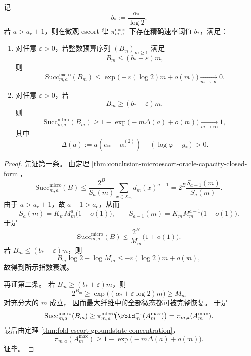 \begin{theorem}[深冻结区的微观预言机相变阈值]\label{thm:conclusion-deepfrozen-microescort-oracle-threshold}
记
\[
b_\ast:=\frac{\alpha_\ast}{\log 2}.
\]
若 \(a>a_{\mathrm c}+1\)，则在微观 escort 律 \(\pi_{m,a}^{\mathrm{micro}}\) 下存在精确速率阈值 \(b_\ast\)，满足：
\begin{enumerate}
  \item 对任意 \(\varepsilon>0\)，若整数预算序列 \((B_m)_{m\ge 1}\) 满足
  \[
  B_m\le (b_\ast-\varepsilon)m,
  \]
  则
  \[
  \mathrm{Succ}^{\mathrm{micro}}_{m,a}(B_m)
  \le
  \exp\!\bigl(-\varepsilon(\log 2)m+o(m)\bigr)
  \xrightarrow[m\to\infty]{}0.
  \]
  \item 对任意 \(\varepsilon>0\)，若
  \[
  B_m\ge (b_\ast+\varepsilon)m,
  \]
  则
  \[
  \mathrm{Succ}^{\mathrm{micro}}_{m,a}(B_m)
  \ge
  1-\exp\!\bigl(-m\Delta(a)+o(m)\bigr)
  \xrightarrow[m\to\infty]{}1,
  \]
  其中
  \[
  \Delta(a):=a(\alpha_\ast-\alpha_\ast^{(2)})-(\log\varphi-g_\ast)>0.
  \]
\end{enumerate}
\end{theorem}
\begin{proof}
先证第一条。
由定理 \ref{thm:conclusion-microescort-oracle-capacity-closed-form}，
\[
\mathrm{Succ}^{\mathrm{micro}}_{m,a}(B)
\le
\frac{2^B}{S_a(m)}
\sum_{x\in X_m}d_m(x)^{a-1}
=
2^B\frac{S_{a-1}(m)}{S_a(m)}.
\]
由于 \(a>a_{\mathrm c}+1\)，故 \(a-1>a_{\mathrm c}\)，从而
\[
S_a(m)=K_mM_m^a\bigl(1+o(1)\bigr),
\qquad
S_{a-1}(m)=K_mM_m^{a-1}\bigl(1+o(1)\bigr).
\]
于是
\[
\mathrm{Succ}^{\mathrm{micro}}_{m,a}(B)
\le
\frac{2^B}{M_m}\bigl(1+o(1)\bigr).
\]
若 \(B_m\le (b_\ast-\varepsilon)m\)，则
\[
B_m\log 2-\log M_m
\le
-\varepsilon(\log 2)m+o(m),
\]
故得到所示指数衰减。

再证第二条。
若 \(B_m\ge (b_\ast+\varepsilon)m\)，则
\[
2^{B_m}\ge \exp\!\bigl((\alpha_\ast+\varepsilon\log 2)m\bigr)\ge M_m
\]
对充分大的 \(m\) 成立，
因而最大纤维中的全部微态都可被完整恢复。
于是
\[
\mathrm{Succ}^{\mathrm{micro}}_{m,a}(B_m)
\ge
\pi_{m,a}^{\mathrm{micro}}\!\bigl(\Fold_m^{-1}(A_m^{\max})\bigr)
=
\pi_{m,a}(A_m^{\max}).
\]
最后由定理 \ref{thm:fold-escort-groundstate-concentration}，
\[
\pi_{m,a}(A_m^{\max})
\ge
1-\exp\!\bigl(-m\Delta(a)+o(m)\bigr).
\]
证毕。
\end{proof}

